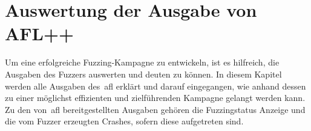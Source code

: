 
\section{Auswertung der Ausgabe von AFL++}\label{sec:auswertung-der-ausgabe-von-afl++}
Um eine erfolgreiche Fuzzing-Kampagne zu entwickeln, ist es hilfreich, die Ausgaben des Fuzzers auswerten und deuten zu können.
In diesem Kapitel werden alle Ausgaben des~\gls{afl} erklärt und darauf eingegangen, wie anhand dessen zu einer möglichst
effizienten und zielführenden Kampagne gelangt werden kann.
Zu den von~\gls{afl} bereitgestellten Ausgaben gehören die Fuzzingstatus Anzeige und die vom Fuzzer erzeugten Crashes,
sofern diese aufgetreten sind.



